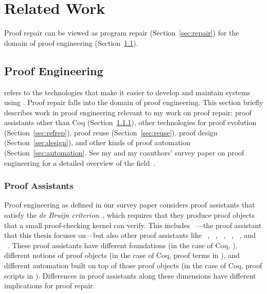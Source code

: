 \chapter{Related Work}
\label{sec:related}


Proof repair can be viewed as program repair (Section~\ref{sec:repair})
for the domain of proof engineering (Section~\ref{sec:proofeng}).

\section{Proof Engineering}
\label{sec:proofeng}

 refers to the technologies that make it easier to develop and maintain
systems  using .
Proof repair falls into the domain of proof engineering.
This section briefly describes work in proof engineering relevant to my work on proof repair:
proof assistants other than Coq (Section~\ref{sec:ass}),
other technologies for proof evolution (Section~\ref{sec:refrep}),
proof reuse (Section~\ref{sec:reuse}),
proof design (Section~\ref{sec:design}),
and other kinds of proof automation (Section~\ref{sec:automation}.
See my and my coauthors' survey paper on proof engineering for a detailed overview of the field~\cite{PGL-045}. %

\subsection{Proof Assistants}
\label{sec:ass}

Proof engineering as defined in our survey paper considers proof assistants that satisfy the \textit{de Bruijn criterion}~\cite{Barendregt2002,Barendregt2351}, which requires that they produce proof objects that a small proof-checking kernel can verify.
This includes ~\cite{coq}---the proof assistant that this thesis focuses on---but also other proof assistants like
~\cite{isabelle}, ~\cite{hollight}, ~\cite{hol4-interact}, ~\cite{agda}, ~\cite{lean}, and ~\cite{nuprl}.
These proof assistants have different foundations (in the case of Coq, ),
different notions of proof objects (in the case of Coq, proof terms in ),
and different automation built on top of those proof objects (in the case of Coq, proof scripts in ).
Differences in proof assistants along these dimensions have different implications for proof repair.

